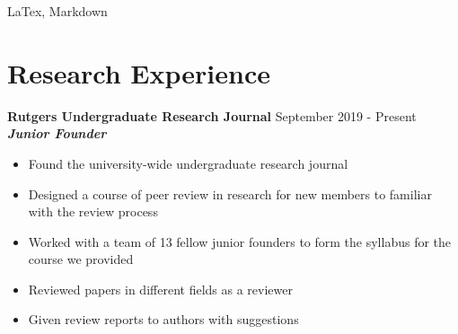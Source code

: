 \documentclass{article}
\begin{document}
LaTex, Markdown

\section{Research Experience}
\textbf{Rutgers Undergraduate Research Journal}
\hfill{September 2019 - Present}\\
\textbf{\textit{Junior Founder}}
\begin{itemize}
  \itemsep0em
  \item Found the university-wide undergraduate research journal
  \item Designed a course of peer review in research for new members to familiar with the
review process
  \item  Worked with a team of 13 fellow junior founders to form the syllabus for the course we
provided
  \item Reviewed papers in different fields as a reviewer
  \item Given review reports to authors with suggestions
\end{itemize}
\end{document}
